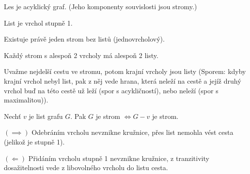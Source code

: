 \documentclass[12pt]{article}					%
\begin{document}
        \begin{definice}[Les]
            Les je acyklický graf. (Jeho komponenty souvislosti jsou stromy.)
        \end{definice}

        \begin{definice}[List]
            List je vrchol stupně 1.
        \end{definice}

        \begin{upozorneni}
            Existuje právě jeden strom bez listů (jednovrcholový).
        \end{upozorneni}

        \begin{lemma}
            Každý strom s alespoň 2 vrcholy má alespoň 2 listy.
            \begin{dukazin}
                Uvažme nejdelší cestu ve stromu, potom krajní vrcholy jsou listy (Sporem: kdyby krajní vrchol nebyl list, pak z něj vede hrana, která neleží na cestě a jejíž druhý vrchol buď na této cestě už leží (spor s acykličností), nebo neleží (spor s maximalitou)).
            \end{dukazin}
        \end{lemma}

        \begin{lemma}
            Nechť $v$ je list grafu $G$. Pak $G$ je strom $\Leftrightarrow G - v$ je strom.
            \begin{dukazin}
                $(\implies)$ Odebráním vrcholu nevznikne kružnice, přes list nemohla vést cesta (jelikož je stupně 1).

                $(\Leftarrow)$ Přidáním vrcholu stupně 1 nevznikne kružnice, z tranzitivity dosažitelnosti vede z libovolného vrcholu do listu cesta.
            \end{dukazin}
        \end{lemma}
\end{document}

